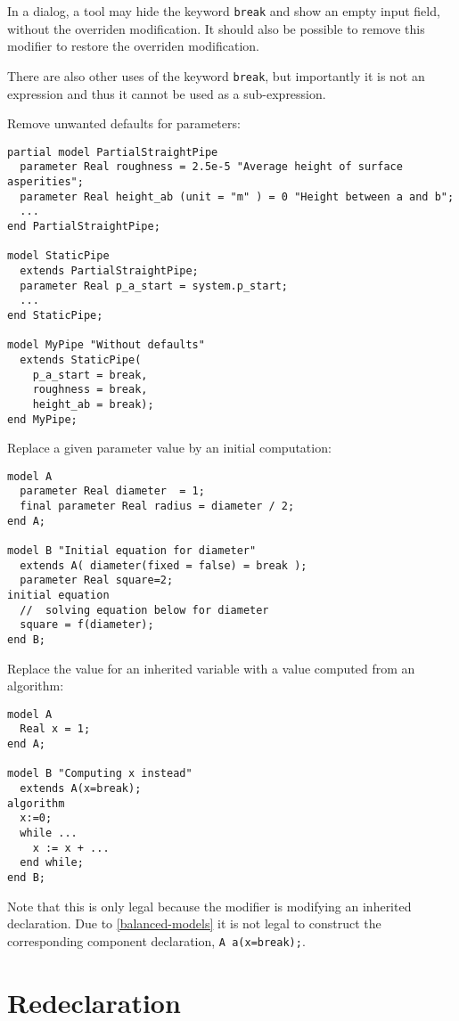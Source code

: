 \begin{nonnormative}
In a dialog, a tool may hide the keyword \lstinline!break! and show an empty input field, without the overriden modification.
It should also be possible to remove this modifier to restore the overriden modification.

There are also other uses of the keyword \lstinline!break!, but importantly it is not an expression and thus it cannot be used as a sub-expression.
\end{nonnormative}

\begin{example}
Remove unwanted defaults for parameters:
\begin{lstlisting}
partial model PartialStraightPipe
  parameter Real roughness = 2.5e-5 "Average height of surface asperities";
  parameter Real height_ab (unit = "m" ) = 0 "Height between a and b";
  ...
end PartialStraightPipe;

model StaticPipe
  extends PartialStraightPipe;
  parameter Real p_a_start = system.p_start;
  ...
end StaticPipe;

model MyPipe "Without defaults"
  extends StaticPipe(
    p_a_start = break,
    roughness = break,
    height_ab = break);
end MyPipe;
\end{lstlisting}
Replace a given parameter value by an initial computation:
\begin{lstlisting}
model A
  parameter Real diameter  = 1;
  final parameter Real radius = diameter / 2;
end A;

model B "Initial equation for diameter"
  extends A( diameter(fixed = false) = break );
  parameter Real square=2;
initial equation
  //  solving equation below for diameter
  square = f(diameter);
end B;
\end{lstlisting}
Replace the value for an inherited variable with a value computed from an algorithm:
\begin{lstlisting}
model A
  Real x = 1;
end A;

model B "Computing x instead"
  extends A(x=break);
algorithm
  x:=0;
  while ...
    x := x + ...
  end while;
end B;
\end{lstlisting}
Note that this is only legal because the modifier is modifying an inherited declaration.
Due to \cref{balanced-models} it is not legal to construct the corresponding component declaration, \lstinline!A a(x=break);!.
\end{example}

\section{Redeclaration}\label{redeclaration}

